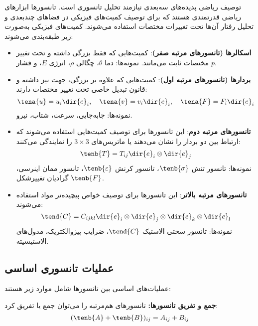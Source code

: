 توصیف ریاضی پدیده‌های سه‌بعدی نیازمند تحلیل تانسوری است. تانسورها ابزارهای ریاضی قدرتمندی هستند که برای توصیف کمیت‌های فیزیکی در فضاهای چندبعدی و تحلیل رفتار آن‌ها تحت تغییرات مختصات استفاده می‌شوند. کمیت‌های فیزیکی به‌صورت زیر طبقه‌بندی می‌شوند:

\begin{itemize}
	\item \textbf{اسکالرها (تانسورهای مرتبه صفر)}: کمیت‌هایی که فقط بزرگی داشته و تحت تغییر مختصات ثابت می‌مانند. نمونه‌ها: دما $\theta$، چگالی $\rho$، انرژی $E$، و فشار $p$.
	
	\item \textbf{بردارها (تانسورهای مرتبه اول)}: کمیت‌هایی که علاوه بر بزرگی، جهت نیز داشته و قانون تبدیل خاصی تحت تغییر مختصات دارند:
	\begin{equation}
		\tena{u} = u_i \dir{e}_i, \quad \tena{v} = v_i \dir{e}_i, \quad \tena{F} = F_i \dir{e}_i
	\end{equation}
	نمونه‌ها: جابه‌جایی، سرعت، شتاب، نیرو.
	
	\item \textbf{تانسورهای مرتبه دوم}: این تانسورها برای توصیف کمیت‌هایی استفاده می‌شوند که ارتباط بین دو بردار را نشان می‌دهند یا ماتریس‌های $3 \times 3$ را نمایندگی می‌کنند:
	\begin{equation}
		\tenb{T} = T_{ij} \dir{e}_i \otimes \dir{e}_j
	\end{equation}
	نمونه‌ها: تانسور تنش $\tenb{\sigma}$، تانسور کرنش $\tenb{\varepsilon}$، تانسور ممان اینرسی، گرادیان تغییرشکل $\tenb{F}$.
	
	\item \textbf{تانسورهای مرتبه بالاتر}: این تانسورها برای توصیف خواص پیچیده‌تر مواد استفاده می‌شوند:
	\begin{equation}
		\tend{C} = C_{ijkl} \dir{e}_i \otimes \dir{e}_j \otimes \dir{e}_k \otimes \dir{e}_l
	\end{equation}
	نمونه‌ها: تانسور سختی الاستیک $\tend{C}$، ضرایب پیزوالکتریک، مدول‌های الاستیسیته.
\end{itemize}

\subsection{عملیات تانسوری اساسی}

عملیات‌های اساسی بین تانسورها شامل موارد زیر هستند:

\textbf{جمع و تفریق تانسورها:} تانسورهای هم‌مرتبه را می‌توان جمع یا تفریق کرد:
\begin{equation}
	(\tenb{A} + \tenb{B})_{ij} = A_{ij} + B_{ij}
\end{equation}

